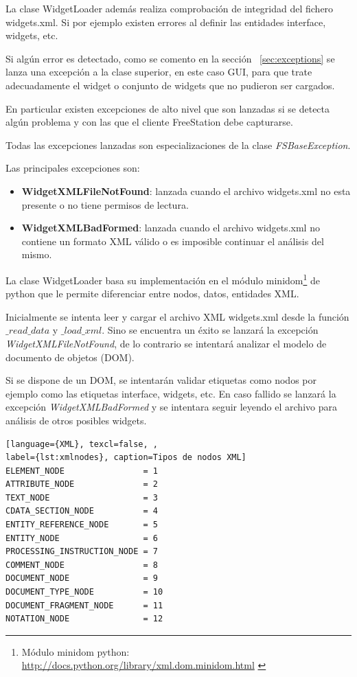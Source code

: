 La clase WidgetLoader además realiza comprobación de integridad del fichero
widgets.xml. Si por ejemplo existen errores al definir las entidades interface,
widgets, etc.

Si algún error es detectado, como se comento en la sección
~\ref{sec:exceptions} se lanza una excepción a la clase superior, en este caso
GUI, para que trate adecuadamente el widget o conjunto de widgets que no 
pudieron ser cargados.

En particular existen excepciones de alto nivel que son lanzadas si se
detecta algún problema y con las que el cliente FreeStation debe capturarse.

Todas las excepciones lanzadas son especializaciones de la clase
\emph{FSBaseException}.

\newpage
Las principales excepciones son:
\begin{itemize}
    \item \textbf{WidgetXMLFileNotFound}: lanzada cuando el archivo widgets.xml no
    esta presente o no tiene permisos de lectura.
    \item \textbf{WidgetXMLBadFormed}: lanzada cuando el archivo widgets.xml no
    contiene un formato XML válido o es imposible continuar el análisis del mismo.
\end{itemize}

La clase WidgetLoader basa su implementación en el módulo
minidom\footnote{Módulo minidom python:\\
\url{http://docs.python.org/library/xml.dom.minidom.html}
\label{ftn:minidom}} de python que
le permite diferenciar entre nodos, datos, entidades XML. 

Inicialmente se intenta leer y cargar el archivo XML widgets.xml desde la 
función $\_read\_data$ y $\_load\_xml$. Sino se encuentra un éxito se
lanzará la excepción \emph{WidgetXMLFileNotFound}, de lo contrario se 
intentará analizar el modelo de documento de objetos (DOM).

Si se dispone de un DOM, se intentarán validar etiquetas como nodos por 
ejemplo como las etiquetas interface, widgets, etc.
En caso fallido se lanzará la excepción \emph{WidgetXMLBadFormed} y se 
intentara seguir leyendo
el archivo para análisis de otros posibles widgets.

\begin{lstlisting}[language={XML}, texcl=false, ,
label={lst:xmlnodes}, caption=Tipos de nodos XML]
ELEMENT_NODE                = 1
ATTRIBUTE_NODE              = 2
TEXT_NODE                   = 3
CDATA_SECTION_NODE          = 4
ENTITY_REFERENCE_NODE       = 5
ENTITY_NODE                 = 6
PROCESSING_INSTRUCTION_NODE = 7
COMMENT_NODE                = 8
DOCUMENT_NODE               = 9
DOCUMENT_TYPE_NODE          = 10
DOCUMENT_FRAGMENT_NODE      = 11
NOTATION_NODE               = 12
\end{lstlisting}

